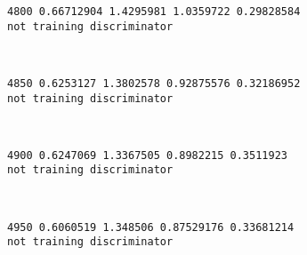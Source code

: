\documentclass[11pt]{article}
\begin{document}
    \begin{Verbatim}[commandchars=\\\{\}]
4800 0.66712904 1.4295981 1.0359722 0.29828584
not training discriminator

    \end{Verbatim}

    \begin{center}
    \end{center}
    { \hspace*{\fill} \\}
    
    \begin{Verbatim}[commandchars=\\\{\}]
4850 0.6253127 1.3802578 0.92875576 0.32186952
not training discriminator

    \end{Verbatim}

    \begin{center}
    \end{center}
    { \hspace*{\fill} \\}
    
    \begin{Verbatim}[commandchars=\\\{\}]
4900 0.6247069 1.3367505 0.8982215 0.3511923
not training discriminator

    \end{Verbatim}

    \begin{center}
    \end{center}
    { \hspace*{\fill} \\}
    
    \begin{Verbatim}[commandchars=\\\{\}]
4950 0.6060519 1.348506 0.87529176 0.33681214
not training discriminator

    \end{Verbatim}

    \begin{center}
    \end{center}
    { \hspace*{\fill} \\}
    
\end{document}

